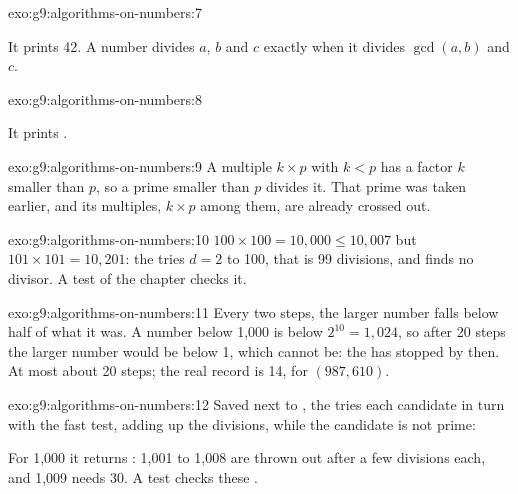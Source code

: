 \begin{solution}{exo:g9:algorithms-on-numbers:7}
\label{lst:g9:algorithms-on-numbers:sol-gcd3}

It prints 42. A number divides $a$, $b$ and $c$ exactly when it divides
$\gcd(a, b)$ and $c$.
\end{solution}

\begin{solution}{exo:g9:algorithms-on-numbers:8}
\label{lst:g9:algorithms-on-numbers:sol-twins}

It prints .
\end{solution}

\begin{solution}{exo:g9:algorithms-on-numbers:9}
A multiple $k \times p$ with $k < p$ has a factor $k$ smaller than $p$, so a
prime smaller than $p$ divides it. That prime was taken earlier, and its
multiples, $k \times p$ among them, are already crossed out.
\end{solution}

\begin{solution}{exo:g9:algorithms-on-numbers:10}
$100 \times 100 = 10{,}000 \le 10{,}007$ but $101 \times 101 = 10{,}201$: the 
tries $d = 2$ to 100, that is 99 divisions, and finds no divisor. A test of the
chapter checks it.
\end{solution}

\begin{solution}{exo:g9:algorithms-on-numbers:11}
Every two steps, the larger number falls below half of what it was. A number
below 1,000 is below $2^{10} = 1{,}024$, so after 20 steps the larger number
would be below 1, which cannot be: the  has stopped by then. At most
about 20 steps; the real record is 14, for $(987, 610)$.
\end{solution}

\begin{solution}{exo:g9:algorithms-on-numbers:12}
Saved next to , the  tries each candidate in turn
with the fast test, adding up the divisions, while the candidate is not prime:

\label{lst:g9:algorithms-on-numbers:sol-next}

For 1,000 it returns : 1,001 to 1,008 are thrown out after a
few divisions each, and 1,009 needs 30. A test checks these .
\end{solution}

